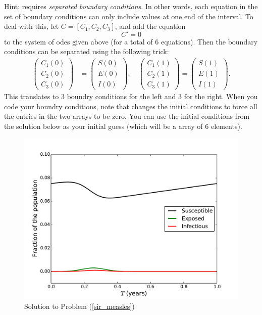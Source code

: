 \begin{problem}
Hint:  requires \emph{separated boundary conditions}. In other words, each equation in the set of boundary conditions can only include values at one end of the interval. 
To deal with this, let $C = [C_1, C_2, C_3]$, and add the equation 
\[C' = 0\]
to the system of odes given above (for a total of 6 equations). Then the boundary conditions can be separated using the following trick: 
\begin{align*}
	\begin{pmatrix}C_1(0) \\C_2(0) \\ C_3(0) \end{pmatrix} &= \begin{pmatrix}S(0) \\E(0) \\ I(0) \end{pmatrix}, \quad 	\begin{pmatrix}C_1(1) \\C_2(1) \\ C_3(1) \end{pmatrix} = \begin{pmatrix}S(1) \\E(1) \\ I(1) \end{pmatrix}.
\end{align*}
This translates to 3 boundry conditions for the left and 3 for the right. When you code your boundry conditions, note that  changes the initial conditions to force all the entries in the two arrays to be zero. You can use the initial conditions from the solution below as your initial guess (which will be a array of 6 elements).

\label{sir_measles}
\end{problem}

\begin{figure}[ht]
\centering
\includegraphics[width=\textwidth]{measles.pdf}
\caption{Solution to Problem (\ref{sir_measles}) }
\label{sir4}
\end{figure}






